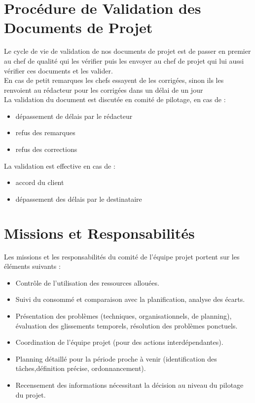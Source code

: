 \documentclass[11pt,fleqn]{book} %
\begin{document}
\section{Procédure de Validation des Documents de 
Projet}
Le cycle de vie de validation de nos documents de projet est de passer en premier au 
chef de qualité qui les vérifier puis les envoyer au chef de projet qui lui aussi vérifier 
ces documents et les valider. \\
En cas de petit remarques les chefs essayent de les corrigées, sinon ils les renvoient au 
rédacteur pour les corrigées dans un délai de un jour \\
La validation du document est discutée en comité de pilotage, en cas de : 
\begin{itemize}
    \item  dépassement de délais par le rédacteur
    \item  refus des remarques
    \item  refus des corrections
\end{itemize}
La validation est effective en cas de : 
\begin{itemize}
    \item accord du client
    \item dépassement des délais par le destinataire
\end{itemize}
\section{ Missions et Responsabilités}
Les missions et les responsabilités du comité de l’équipe projet portent sur les éléments suivants :
\begin{itemize}
    \item Contrôle de l’utilisation des ressources allouées.
    \item Suivi du consommé et comparaison avec la planification, analyse des écarts.
    \item Présentation des problèmes (techniques, organisationnels, de planning), évaluation des glissements temporels, résolution des problèmes ponctuels.
    \item Coordination de l’équipe projet (pour des actions interdépendantes).
    \item Planning détaillé pour la période proche à venir (identification des tâches,définition précise, ordonnancement).
    \item Recensement des informations nécessitant la décision au niveau du pilotage du projet.
\end{itemize}
\end{document}
